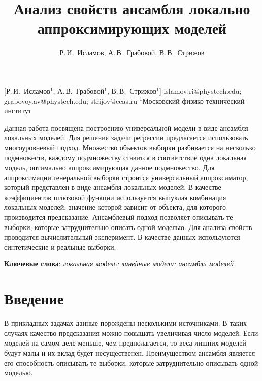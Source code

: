 \documentclass[12pt, twoside]{article}
\begin{document}
\title
    [Анализ свойств ансамбля локально аппроксимирующих моделей] %
    {Анализ свойств ансамбля локально аппроксимирующих моделей}
\author
    [Р.\,И.~Исламов, А.\,В.~Грабовой, В.\,В.~Стрижов] %
    {Р.\,И.~Исламов, А.\,В.~Грабовой, В.\,В.~Стрижов} %
    [Р.\,И.~Исламов$^1$, А.\,В.~Грабовой$^1$, В.\,В.~Стрижов$^{1}$] %
\email
    {islamov.ri@phystech.edu; grabovoy.av@phystech.edu;  strijov@ccas.ru}
\organization
    {$^1$Московский физико-технический институт}
\abstract
    {Данная работа посвящена построению универсальной модели в виде ансамбля локальных моделей. Для решения задачи регрессии  предлагается использовать многоуровневый подход. Множество объектов выборки разбивается на несколько подмножеств, каждому подмножеству ставится в соответствие одна локальная модель, оптимально аппроксимирующая данное подмножество. Для аппроксимации генеральной выборки строится универсальный аппроксиматор, который представлен в виде ансамбля локальных моделей. В качестве коэффициентов шлюзовой функции используется выпуклая комбинация локальных моделей, значение которой зависит от объекта, для которого производится предсказание. Ансамблевый подход позволяет описывать те выборки, которые затруднительно описать одной моделью. Для анализа свойств проводится вычислительный эксперимент. В качестве данных используются синтетические и реальные выборки.   
	
\bigskip
\noindent
\textbf{Ключевые слова}: \emph {локальная модель; линейные модели; ансамбль моделей.}
}

\maketitle
\linenumbers

\section{Введение}

В прикладных задачах данные порождены несколькими источниками. В таких случаях качество предсказания можно повышать увеличивая число моделей. Если моделей на самом деле меньше, чем предполагается, то веса лишних моделей будут малы и их вклад
будет несущественен. Преимуществом ансамбля является его способность описывать те выборки, которые затруднительно описывать одной моделью.
\end{document}
